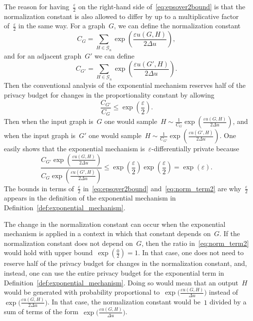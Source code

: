 \documentclass[conference]{ieeeconf}
\begin{document}
The reason for having~$\frac{\varepsilon}{2}$ on the right-hand side of~\eqref{eq:epsover2bound} 
is that the normalization
constant is also allowed to differ by up to a multiplicative factor of~$\frac{\varepsilon}{2}$
in the same way. 
For a graph~$G$, we can define the normalization constant
\begin{equation} \label{eq:norm_term}
C_{G} = \sum_{H\in\mathcal{G}_n}\exp\left(\frac{\varepsilon u(G,H)}{2\Delta u}\right),
\end{equation}
and for an adjacent graph~$G'$ we can define
\begin{equation} 
C_{G'} = \sum_{H\in\mathcal{G}_n}\exp\left(\frac{\varepsilon u(G',H)}{2\Delta u}\right).
\end{equation}
Then the conventional analysis of the exponential mechanism 
reserves half of the privacy budget for changes in the proportionality constant
by allowing
\begin{equation} \label{eq:norm_term2}
\frac{C_{G'}}{C_{G}} \leq \exp\left(\frac{\varepsilon}{2}\right). 
\end{equation}
Then when the input graph is~$G$ one would sample~$H \sim \frac{1}{C_G}\exp\left(\frac{\varepsilon u(G,H)}{2\Delta u}\right)$, 
and when the input graph is~$G'$ one would sample~$H \sim \frac{1}{C_{G'}}\exp\left(\frac{\varepsilon u(G',H)}{2\Delta u}\right)$. 
One easily shows that the exponential mechanism is~$\varepsilon$-differentially private
because
\begin{equation}
\frac{C_{G'}\exp\left(\frac{\varepsilon u(G,H)}{2\Delta u}\right)}{C_{G}\exp\left(\frac{\varepsilon u(G',H)}{2\Delta u}\right)} \leq \exp\left(\frac{\varepsilon}{2}\right)\exp\left(\frac{\varepsilon}{2}\right) = \exp(\varepsilon). 
\end{equation}
The bounds in terms of~$\frac{\varepsilon}{2}$ in~\eqref{eq:epsover2bound}
and~\eqref{eq:norm_term2} are why~$\frac{\varepsilon}{2}$
appears in the definition of the exponential mechanism in
Definition~\ref{def:exponential_mechanism}. 


The change in the normalization constant 
can occur when the exponential mechanism is applied in a context
in which that constant depends on~$G$. 
If the normalization constant does not depend on~$G$,
then the ratio in~\eqref{eq:norm_term2} would hold with upper
bound~$\exp\left(\frac{0}{2}\right) = 1$.
In that case, one does not need to reserve half of the privacy
budget for changes in the normalization constant,
and, instead, one can use the entire privacy budget for the exponential term
in Definition~\ref{def:exponential_mechanism}. Doing so would
mean that an output~$H$ would be generated with probability proportional
to~$\exp\big(\frac{\varepsilon u(G,H)}{\Delta u}\big)$
instead of~$\exp\big(\frac{\varepsilon u(G,H)}{2\Delta u}\big)$.
In that case, the normalization constant would be~$1$ divided by a sum
of terms of the form~$\exp\big(\frac{\varepsilon u(G,H)}{\Delta u}\big)$. 
\end{document}
